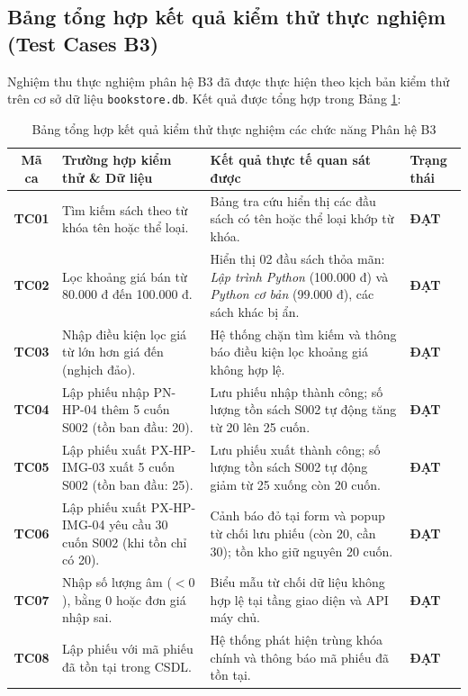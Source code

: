 \documentclass[12pt,a4paper]{article}
\begin{document}
\newpage
\subsection{Bảng tổng hợp kết quả kiểm thử thực nghiệm (Test Cases B3)}
\label{subsec:kiem-thu-b3}

Nghiệm thu thực nghiệm phân hệ B3 đã được thực hiện theo kịch bản kiểm thử trên cơ sở dữ liệu \texttt{bookstore.db}. Kết quả được tổng hợp trong Bảng \ref{tab:b3-kiem-thu}:

\begin{table}[H]
\centering
\small
\singlespacing
\renewcommand{\arraystretch}{1.25}
\begin{tabularx}{\textwidth}{|c|>{\raggedright\arraybackslash}p{3.8cm}|>{\raggedright\arraybackslash}X|>{\centering\arraybackslash}p{2.0cm}|}
\hline
\textbf{Mã ca} & \textbf{Trường hợp kiểm thử \& Dữ liệu} & \textbf{Kết quả thực tế quan sát được} & \textbf{Trạng thái} \\
\hline
\textbf{TC01} & Tìm kiếm sách theo từ khóa tên hoặc thể loại. & Bảng tra cứu hiển thị các đầu sách có tên hoặc thể loại khớp từ khóa. & \textbf{ĐẠT} \\
\hline
\textbf{TC02} & Lọc khoảng giá bán từ 80.000 đ đến 100.000 đ. & Hiển thị 02 đầu sách thỏa mãn: \textit{Lập trình Python} (100.000 đ) và \textit{Python cơ bản} (99.000 đ), các sách khác bị ẩn. & \textbf{ĐẠT} \\
\hline
\textbf{TC03} & Nhập điều kiện lọc giá từ lớn hơn giá đến (nghịch đảo). & Hệ thống chặn tìm kiếm và thông báo điều kiện lọc khoảng giá không hợp lệ. & \textbf{ĐẠT} \\
\hline
\textbf{TC04} & Lập phiếu nhập PN-HP-04 thêm 5 cuốn S002 (tồn ban đầu: 20). & Lưu phiếu nhập thành công; số lượng tồn sách S002 tự động tăng từ 20 lên 25 cuốn. & \textbf{ĐẠT} \\
\hline
\textbf{TC05} & Lập phiếu xuất PX-HP-IMG-03 xuất 5 cuốn S002 (tồn ban đầu: 25). & Lưu phiếu xuất thành công; số lượng tồn sách S002 tự động giảm từ 25 xuống còn 20 cuốn. & \textbf{ĐẠT} \\
\hline
\textbf{TC06} & Lập phiếu xuất PX-HP-IMG-04 yêu cầu 30 cuốn S002 (khi tồn chỉ có 20). & Cảnh báo đỏ tại form và popup từ chối lưu phiếu (còn 20, cần 30); tồn kho giữ nguyên 20 cuốn. & \textbf{ĐẠT} \\
\hline
\textbf{TC07} & Nhập số lượng âm ($< 0$), bằng 0 hoặc đơn giá nhập sai. & Biểu mẫu từ chối dữ liệu không hợp lệ tại tầng giao diện và API máy chủ. & \textbf{ĐẠT} \\
\hline
\textbf{TC08} & Lập phiếu với mã phiếu đã tồn tại trong CSDL. & Hệ thống phát hiện trùng khóa chính và thông báo mã phiếu đã tồn tại. & \textbf{ĐẠT} \\
\hline
\end{tabularx}
\caption{Bảng tổng hợp kết quả kiểm thử thực nghiệm các chức năng Phân hệ B3}
\label{tab:b3-kiem-thu}
\end{table}
\end{document}
